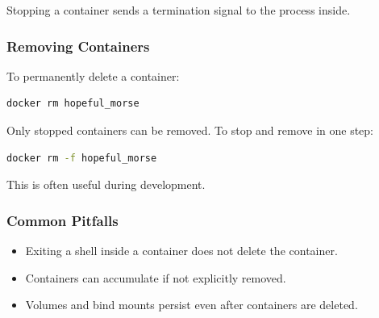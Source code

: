 \documentclass{../juni}
\begin{document}
Stopping a container sends a termination signal to the process inside.

\subsubsection{Removing Containers}

To permanently delete a container:

\begin{lstlisting}[language=bash]
docker rm hopeful_morse
\end{lstlisting}

Only stopped containers can be removed. To stop and remove in one step:

\begin{lstlisting}[language=bash]
docker rm -f hopeful_morse
\end{lstlisting}

This is often useful during development.

\subsubsection{Common Pitfalls}

\begin{itemize}
  \item Exiting a shell inside a container does not delete the container.
  \item Containers can accumulate if not explicitly removed.
  \item Volumes and bind mounts persist even after containers are deleted.
\end{itemize}
\end{document}

